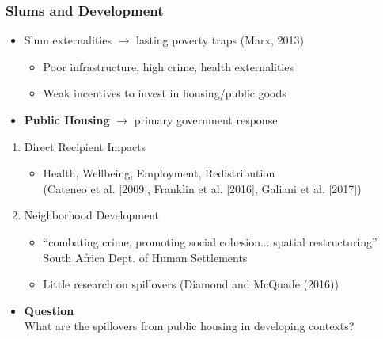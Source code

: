\documentclass[aspectratio=149]{beamer}
\begin{document}
\begin{frame}
\frametitle{Slums and Development}


\begin{itemize}
  \item Slum externalities $\rightarrow$ lasting poverty traps (Marx, 2013) 
    \begin{itemize}
      \item Poor infrastructure, high crime, health externalities
      \item Weak incentives to invest in housing/public goods
    \end{itemize}  
\vspace{.2cm}
\pause
  \item \textbf{Public Housing} $\rightarrow$ primary government response
\end{itemize}
    \pause
\begin{enumerate}
  \item Direct Recipient Impacts
    \begin{itemize}
      \item Health, Wellbeing, Employment, Redistribution \\ \footnotesize{(Cateneo et al. [2009], Franklin et al. [2016], Galiani et al. [2017])}
    \end{itemize}
    \pause
    \vspace{.1cm}
\item Neighborhood Development
  \begin{itemize}
    \item ``combating crime, promoting social cohesion... spatial restructuring'' South Africa Dept. of Human Settlements
    \pause
    \item Little research on spillovers \footnotesize{(Diamond and McQuade (2016))}
  \end{itemize}
\end{enumerate}

\begin{itemize}
  \item \textbf{Question} \\ 
  \vspace{.1cm}
  What are the spillovers from public housing in developing contexts?
\end{itemize}
\end{frame}
\end{document}
